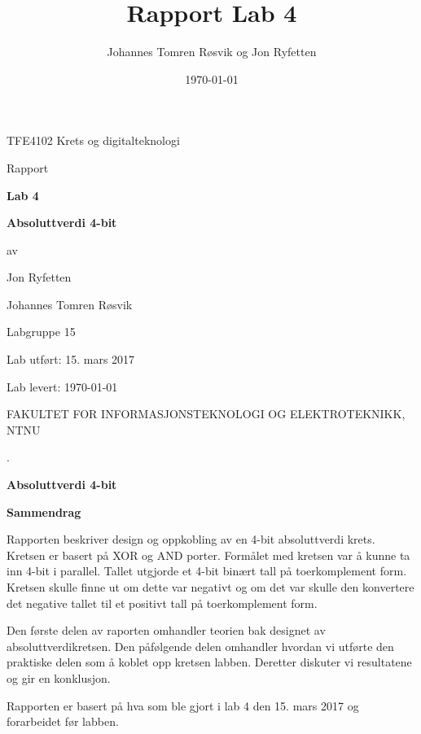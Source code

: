\documentclass{article}
\title{Rapport Lab 4}
\author{Johannes Tomren Røsvik og Jon Ryfetten}
\date{\today}
\begin{document}


\begin{titlepage}
	\centering
	{\Large TFE4102 Krets og digitalteknologi \par}
	\vfill
	{\Large Rapport\par}
	\vspace{0.5cm}
	{\huge\bfseries Lab 4\par}
	{\huge\bfseries Absoluttverdi 4-bit\par}
	\vfill
	{av\par}
	{\Large Jon Ryfetten\par}
	{\Large Johannes Tomren Røsvik\par}
	\vspace{1cm}
	{\large Labgruppe 15 \par}
	\vfill
	{\large Lab utført: 15. mars 2017 \par}
	{\large Lab levert: \today \par}
	\vfill
	{FAKULTET FOR INFORMASJONSTEKNOLOGI OG ELEKTROTEKNIKK, NTNU \par}
\end{titlepage}

\begin{titlepage}
	\centering
	{.\par}
	\vspace{7cm}
	{\huge\bfseries Absoluttverdi 4-bit \par}
	\vfill
\end{titlepage}

\newpage
{\large\bfseries Sammendrag}

Rapporten beskriver design og oppkobling av en 4-bit absoluttverdi krets. Kretsen er basert på XOR og AND porter. Formålet med kretsen var å kunne ta inn 4-bit i parallel. Tallet utgjorde et 4-bit binært tall på toerkomplement form. Kretsen skulle finne ut om dette var negativt og om det var skulle den konvertere det negative tallet til et positivt tall på toerkomplement form.

Den første delen av raporten omhandler teorien bak designet av absoluttverdikretsen. Den påfølgende delen omhandler hvordan vi utførte den praktiske delen som å koblet opp kretsen labben. Deretter diskuter vi resultatene og gir en konklusjon.

Rapporten er basert på hva som ble gjort i lab 4 den 15. mars 2017 og forarbeidet før labben.

\newpage

\tableofcontents{}
\end{document}
